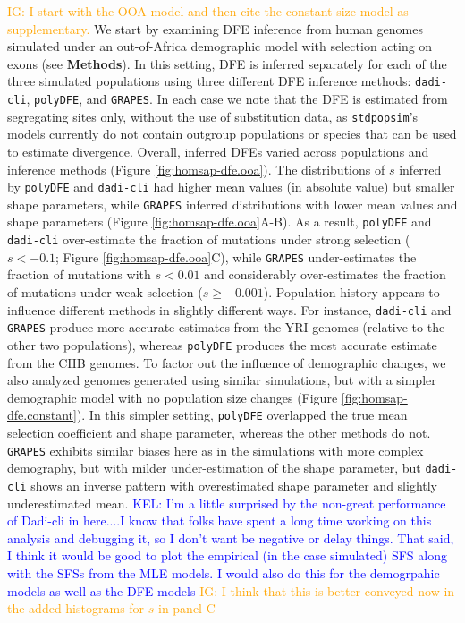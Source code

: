 \documentclass[hidelinks]{article}
\newcommand{\stdpopsim}{\texttt{stdpopsim}\xspace}
\newcommand{\polydfe}{\texttt{polyDFE}\xspace}
\newcommand{\dadicli}{\texttt{dadi-cli}\xspace}
\newcommand{\grapes}{\texttt{GRAPES}\xspace}
\newcommand{\kelcomment}[1]{\textcolor{blue}{KEL: #1}}
\newcommand{\igcomment}[1]{\textcolor{orange}{IG: #1}}
\begin{document}
 
    \igcomment{I start with the OOA model and then cite the constant-size model as supplementary.}
    We start by examining DFE inference from human genomes simulated under an out-of-Africa demographic model
    with selection acting on exons (see \textbf{Methods}).
    In this setting, DFE is inferred separately for each of the three simulated populations
    using three different DFE inference methods: \dadicli \citep{Huang2023}, \polydfe \citep{tataru2020polydfe}, 
    and \grapes \citep{galtier2016adaptive}.
    In each case we note that the DFE is estimated from segregating sites only,
    without the use of substitution data, as \stdpopsim's models currently do not
    contain outgroup populations or species that can be used to estimate divergence.
    Overall, inferred DFEs varied across populations and inference methods (Figure \ref{fig:homsap-dfe.ooa}).
    The distributions of $s$ inferred by \polydfe and \dadicli had higher mean values (in absolute value)
    but smaller shape parameters, while \grapes inferred distributions with lower mean values and shape parameters (Figure \ref{fig:homsap-dfe.ooa}A-B).
    As a result, \polydfe and \dadicli over-estimate the fraction of mutations under strong selection ($s<-0.1$; Figure \ref{fig:homsap-dfe.ooa}C),
    while \grapes under-estimates the fraction of mutations with $s<0.01$ and considerably over-estimates the fraction of
    mutations under weak selection ($s\geq-0.001$).
    Population history appears to influence different methods in slightly different ways.
    For instance, \dadicli and \grapes produce more accurate estimates from the YRI genomes 
    (relative to the other two populations), whereas \polydfe
    produces the most accurate estimate from the CHB genomes.
    To factor out the influence of demographic changes, we also analyzed genomes generated using similar
    simulations, but with a simpler demographic model with no population size changes (Figure \ref{fig:homsap-dfe.constant}).
    In this simpler setting, \polydfe overlapped the true mean selection coefficient and shape parameter, whereas 
    the other methods do not. 
    \grapes exhibits similar biases here as in the simulations with more complex demography,
    but with milder under-estimation of the shape parameter, but \dadicli shows an inverse pattern
    with overestimated shape parameter and slightly underestimated mean. 
\kelcomment{I'm a little surprised by the non-great performance of Dadi-cli in here....I know that folks have spent a long time working on this analysis and debugging it, so I don't want be negative or delay things. That said, I think it would be good to plot the empirical (in the case simulated) SFS along with the SFSs from the MLE models. I would also do this for the demogrpahic models as well as the DFE models}
\igcomment{I think that this is better conveyed now in the added histograms for $s$ in panel C}
\end{document}
